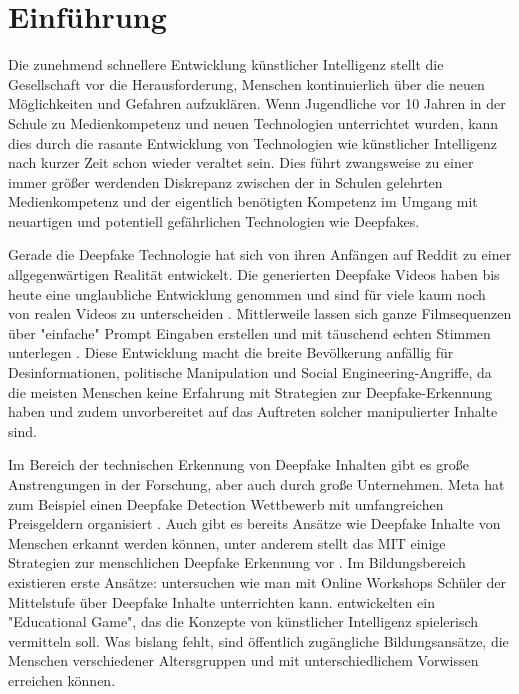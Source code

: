 %
%


\chapter{Einführung}
\label{sec:introduction}
Die zunehmend schnellere Entwicklung künstlicher Intelligenz stellt die Gesellschaft vor die Herausforderung, 
Menschen kontinuierlich über die neuen Möglichkeiten und Gefahren aufzuklären. 
Wenn Jugendliche vor 10 Jahren in der Schule zu Medienkompetenz und neuen Technologien unterrichtet wurden, 
kann dies durch die rasante Entwicklung von Technologien wie künstlicher Intelligenz nach kurzer Zeit schon wieder veraltet sein. 
Dies führt zwangsweise zu einer immer größer werdenden Diskrepanz zwischen der in Schulen gelehrten Medienkompetenz 
und der eigentlich benötigten Kompetenz im Umgang mit neuartigen und potentiell gefährlichen Technologien wie Deepfakes.

Gerade die Deepfake Technologie hat sich von ihren Anfängen auf Reddit \cite{seowComprehensiveOverviewDeepfake2022} zu einer allgegenwärtigen Realität entwickelt. 
Die generierten Deepfake Videos haben bis heute eine unglaubliche Entwicklung genommen und sind für viele kaum noch von realen Videos zu unterscheiden \cite{dielHumanPerformanceDetecting2024}. 
Mittlerweile lassen sich ganze Filmsequenzen über "einfache" Prompt Eingaben erstellen und mit täuschend echten Stimmen unterlegen \cite{proschofskyGooglesNeueVideoKI2025}. 
Diese Entwicklung macht die breite Bevölkerung anfällig für Desinformationen, politische Manipulation und Social Engineering-Angriffe, 
da die meisten Menschen keine Erfahrung mit Strategien zur Deepfake-Erkennung haben und zudem unvorbereitet auf das Auftreten solcher manipulierter Inhalte sind.

Im Bereich der technischen Erkennung von Deepfake Inhalten gibt es große Anstrengungen in der Forschung, aber auch durch große Unternehmen. 
Meta hat zum Beispiel einen Deepfake Detection Wettbewerb mit umfangreichen Preisgeldern organisiert \cite{DeepfakeDetectionChallengea}. 
Auch gibt es bereits Ansätze wie Deepfake Inhalte von Menschen erkannt werden können, 
unter anderem stellt das MIT einige Strategien zur menschlichen Deepfake Erkennung vor \cite{ProjectOverviewDetect}. 
Im Bildungsbereich existieren erste Ansätze: \textcite{aliExploringGenerativeModels2021} untersuchen wie man mit Online Workshops Schüler der Mittelstufe über Deepfake Inhalte unterrichten kann. 
\textcite{wangBecomingFeiEducational2025} entwickelten ein "Educational Game", das die Konzepte von künstlicher Intelligenz spielerisch vermitteln soll. 
Was bislang fehlt, sind öffentlich zugängliche Bildungsansätze, die Menschen verschiedener Altersgruppen und mit unterschiedlichem Vorwissen erreichen können.

